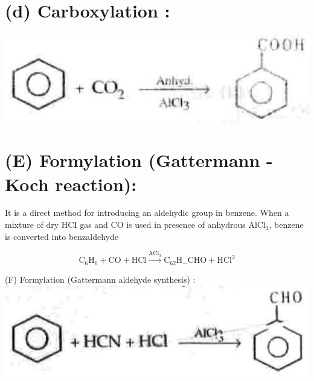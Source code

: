 \documentclass[10pt]{article}
\begin{document}
\section*{(d) Carboxylation :}
\begin{center}
\includegraphics[max width=\textwidth]{2025_01_28_8470952b98110cec3aabg-209(6)}
\end{center}

\section*{(E) Formylation (Gattermann - Koch reaction):}
It is a direct method for introducing an aldehydic group in benzene. When a mixture of dry HCI gas and CO is used in presence of anhydrous $\mathrm{AlCl}_{3}$, benzene is converted into benzaldehyde

$$
\mathrm{C}_{6} \mathrm{H}_{6}+\mathrm{CO}+\mathrm{HCl} \xrightarrow{\mathrm{ACl}_{3}} \mathrm{C}_{62} \mathrm{H}_{-} \mathrm{CHO}+\mathrm{HCl}^{2}
$$

(F) Formylation (Gattermann aldehyde synthesis) :\\
\includegraphics[max width=\textwidth, center]{2025_01_28_8470952b98110cec3aabg-210}
\end{document}
